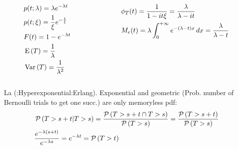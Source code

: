 \documentclass[asd-beamer.tex]{subfiles}%
\begin{document}
\begin{frame}{}
    \begin{columns}[T]
        \begin{column}{0.5\textwidth}
\begin{align*}
&p(t;\lambda)=\lambda e^{-\lambda t}\\
&p(t;\xi)=\frac{1}{\xi}e^{-\frac{t}{\xi}}\\
&F(t)=1-e^{-\lambda t}\\
&\operatorname{E}{(T)}=\frac{1}{\lambda}\\
&\operatorname{Var}{(T)}=\frac{1}{\lambda^2}
\end{align*}            
        \end{column}
        \begin{column}{0.5\textwidth}
            \begin{align*}
&\phi_T(t)=\frac{1}{1-it\xi}=\frac{\lambda}{\lambda-it}\\
&M_e(t)=\lambda\int_{0}^{+\infty}{}e^{-(\lambda-t)x}\,dx=\frac{\lambda}{\lambda-t}
            \end{align*}
        \end{column}
    \end{columns}
    
    La  (:Hyperexponential:Erlang). Exponential and geometric (Prob. number of Bernoulli trials to get one succ.) are only memoryless pdf:
    \begin{align*}
        &\operatorname{\mathcal{P}}{(T>s+t|T>s)}=\frac{\operatorname{\mathcal{P}}{(T>s+t\cap T>s)}}{\operatorname{\mathcal{P}}{(T>s)}}=\frac{\operatorname{\mathcal{P}}{(T>s+t)}}{\operatorname{\mathcal{P}}{(T>s)}}\\
        &\frac{e^{-\lambda(s+t)}}{e^{-\lambda s}}=e^{-\lambda t}=\operatorname{\mathcal{P}}{(T>t)}
    \end{align*}
\end{frame}
\end{document}

